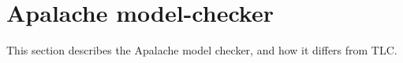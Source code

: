 \section{Apalache model-checker}


This section describes the Apalache model checker, and how it differs from TLC.